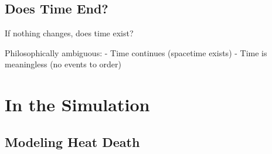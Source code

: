\documentclass[
  11pt,
  letterpaper,
  twoside,
  openright]{book}
\begin{document}
\subsection{Does Time End?}\label{does-time-end}

If nothing changes, does time exist?

Philosophically ambiguous: - Time continues (spacetime exists) - Time is
meaningless (no events to order)

\section{In the Simulation}\label{in-the-simulation-2}

\subsection{Modeling Heat Death}\label{modeling-heat-death}
\end{document}
